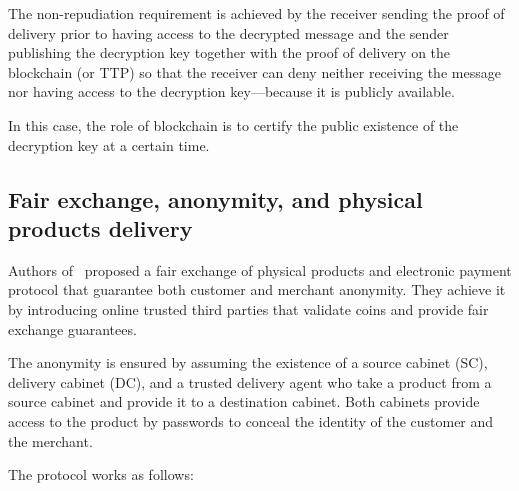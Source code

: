 \documentclass{ieeeaccess}
\begin{document}
The non-repudiation requirement is achieved by the receiver sending the proof of delivery prior to having access to the decrypted message and the sender publishing the decryption key together with the proof of delivery on the blockchain (or TTP) so that the receiver can deny neither receiving the message nor having access to the decryption key—because it is publicly available.

In this case, the role of blockchain is to certify the public existence of the decryption key at a certain time.

\subsection{Fair exchange, anonymity, and physical products delivery} 
\label{anonymity-and-fair-exchange-in-e-commerce-protocol-for-physical-products-delivery}

Authors of~\cite{birjoveanu2015anonymity} proposed a
fair exchange of physical products and electronic payment protocol that
guarantee both customer and merchant anonymity. They achieve it by
introducing online trusted third parties that validate coins and provide
fair exchange guarantees.

The anonymity is ensured by assuming the existence of a source cabinet (SC), delivery cabinet (DC), and a trusted delivery agent who take
a product from a source cabinet and provide it to a destination cabinet.
Both cabinets provide access to the product by passwords to conceal
the identity of the customer and the merchant.

The protocol works as follows: \begingroup
\renewcommand{\labelenumii}{\arabic{enumii}.}
\end{document}
